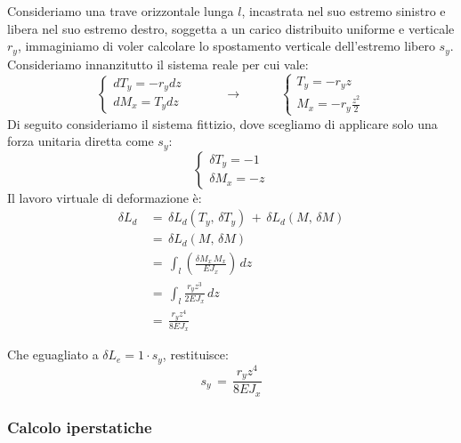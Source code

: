 \begin{esempioBox}
Consideriamo una trave orizzontale lunga $l$, incastrata nel suo estremo sinistro e libera nel suo estremo destro, soggetta a un carico distribuito uniforme e verticale  $r_y$, immaginiamo di voler calcolare lo spostamento verticale dell'estremo libero $s_y$.
Consideriamo innanzitutto il sistema reale per cui vale:
\begin{equation*}
    \begin{cases}
        dT_y = -r_y dz\\
        dM_x = T_ydz
    \end{cases}
    \quad\quad\quad \rightarrow\quad\quad\quad 
    \begin{cases}
        T_y = -r_y z\\
        M_x = -r_y \frac{z^2}{2}
    \end{cases}
\end{equation*}
Di seguito consideriamo il sistema fittizio, dove scegliamo di applicare solo una forza unitaria diretta come $s_y$:
\begin{equation*}
    \begin{cases}
        \delta T_y = -1\\
        \delta M_x = -z
    \end{cases}
\end{equation*}
Il lavoro virtuale di deformazione è:
\begin{align*}
    \delta L_d \,&=\, \delta L_d(T_y, \, \delta T_y)\,+\,\delta L_d(M, \, \delta M)\\
    &= \,\delta L_d(M, \, \delta M)\\
    &=\, \int_l 
    \left(
         \frac{\delta M_x \, M_x}{E J_x} 
    \right) \, dz \\
    &=\, \int_l    \frac{r_y z^3}{2E J_x}  \, dz \\
    &=\, \frac{r_y z^4}{8E J_x}
\end{align*}

Che eguagliato a $\delta L_e = 1\cdot s_y$, restituisce:
\begin{equation*}
    s_y\,=\, \frac{r_y z^4}{8E J_x}
\end{equation*}
\end{esempioBox}




\subsubsection*{Calcolo iperstatiche}

